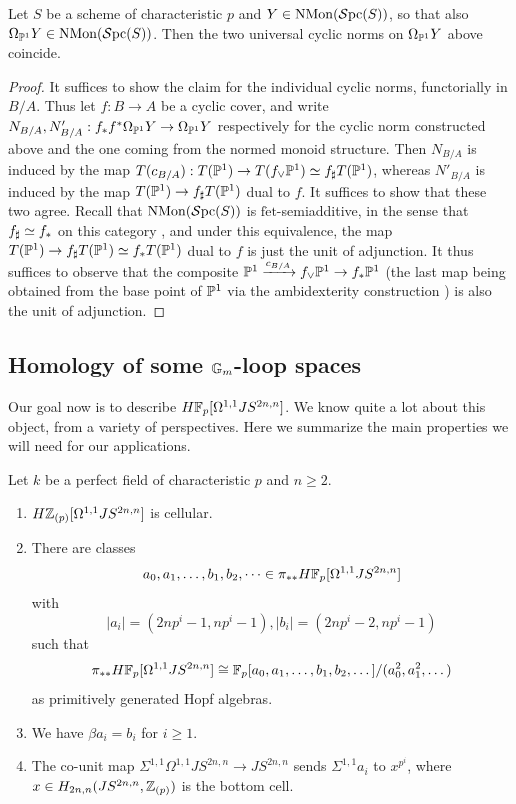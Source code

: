 \documentclass{amsart}
\renewcommand{\NB}[1]{}
\numberwithin{proposition}{section}
\numberwithin{equation}{section}
\def\fet{\mathrm{f\acute et}}
\def\NMon{\mathrm{NMon}}
\begin{document}
\begin{proposition} \label{prop:compare-norms}
Let $S$ be a scheme of characteristic $p$ and $Y \in \NMon(\Spc(S))$, so that also $\Omega_{\P^1} Y \in \NMon(\Spc(S))$.
Then the two universal cyclic norms on $\Omega_{\P^1} Y$ above coincide.
\end{proposition}
\begin{proof}
It suffices to show the claim for the individual cyclic norms, functorially in $B/A$.
Thus let $f: B \to A$ be a cyclic cover, and write $N_{B/A}, N'_{B/A}: f_*f^* \Omega_{\P^1} Y \to \Omega_{\P^1} Y$ respectively for the cyclic norm constructed above and the one coming from the normed monoid structure.
Then $N_{B/A}$ is induced by the map $T(c_{B/A}): T(\P^1) \to T(f_\vee \P^1) \wequi f_\sharp T(\P^1)$, whereas $N'_{B/A}$ is induced by the map $T(\P^1) \to f_\sharp T(\P^1)$ dual to $f$.
It suffices to show that these two agree.
Recall that $\NMon(\Spc(S))$ is $\fet$-semiadditive, in the sense that $f_\sharp \wequi f_*$ on this category \cite[Proposition~6.8]{bachmann-MGM}, and under this equivalence, the map $T(\P^1) \to f_\sharp T(\P^1) \wequi f_* T(\P^1)$ dual to $f$ is just the unit of adjunction.
It thus suffices to observe that the composite $\P^1 \xrightarrow{c_{B/A}} f_\vee \P^1 \to f_* \P^1$ (the last map being obtained from the base point of $\P^1$ via the ambidexterity construction \cite[\S5.3, (5.20)]{hoyois-equivariant}) is also the unit of adjunction.\NB{details...?}
\end{proof}

\subsection{Homology of some $\Gm$-loop spaces} \label{subsec:homology-Gm}
Our goal now is to describe $H\F_p[\Omega^{1,1}JS^{2n,n}]$.
We know quite a lot about this object, from a variety of perspectives.
Here we summarize the main properties we will need for our applications.

\begin{theorem}\label{thm:loops2S3-new}
Let $k$ be a perfect field of characteristic $p$ and $n \ge 2$.
\begin{enumerate}
\item $H\Z_{(p)}[\Omega^{1,1}JS^{2n,n}]$ is cellular.
\item There are classes \[ a_0, a_1, \dots, b_1, b_2, \dots \in \pi_{**}H\F_p[\Omega^{1,1}JS^{2n,n}] \] with \[ |a_i| = (2np^i-1,np^i-1), |b_i|=(2np^i-2,np^i-1) \] such that \[ \pi_{**}H\F_p[\Omega^{1,1}JS^{2n,n}] \cong \F_p[a_0, a_1, \dots, b_1, b_2, \dots]/(a_0^2,a_1^2,\dots) \] as primitively generated Hopf algebras.
\item We have $\beta a_i = b_i$ for $i \ge 1$.
\item The co-unit map $\Sigma^{1,1}\Omega^{1,1}JS^{2n,n} \to JS^{2n,n}$ sends $\Sigma^{1,1}a_i$ to $x^{p^i}$, where $x \in H_{2n,n}(JS^{2n,n}, \Z_{(p)})$ is the bottom cell.
\end{enumerate}
\end{theorem}
\end{document}
